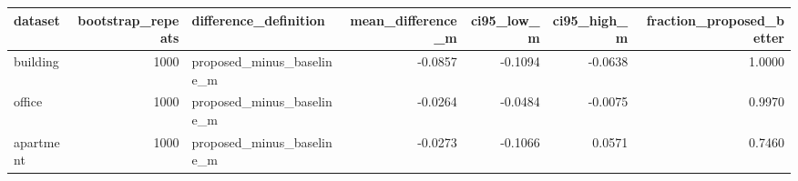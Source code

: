 \begin{tabular}{lrlrrrr}
\toprule
dataset & bootstrap\_repeats & difference\_definition & mean\_difference\_m & ci95\_low\_m & ci95\_high\_m & fraction\_proposed\_better \\
\midrule
building & 1000 & proposed\_minus\_baseline\_m & -0.0857 & -0.1094 & -0.0638 & 1.0000 \\
office & 1000 & proposed\_minus\_baseline\_m & -0.0264 & -0.0484 & -0.0075 & 0.9970 \\
apartment & 1000 & proposed\_minus\_baseline\_m & -0.0273 & -0.1066 & 0.0571 & 0.7460 \\
\bottomrule
\end{tabular}
